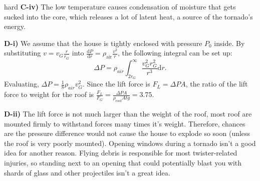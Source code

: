 \begin{solution}{hard}
\noindent \textbf{C-iv)} The low temperature causes condensation of moisture that gets sucked into the core, which releases a lot of latent heat, a source of the tornado's energy.
\vspace{3mm}

\noindent \textbf{D-i)} We assume that the house is tightly enclosed with pressure $P_0$ inside.
By substituting $v = v_G\frac{r}{r_G}$ into $\frac{\mathrm{d}P}{\mathrm{d}r} = \rho_{\text{air}}\frac{v^2}{r}$, the following integral can be set up: 
\[\Delta P = \rho_{air}\int_{2r_G}^{\infty} \frac{v_G^2r_G^2}{r^3} \mathrm{d}r.\]
Evaluating, $\Delta P = \frac{1}{8}\rho_{air}v_G^2$. Since the lift force is $F_L = \Delta PA$, the ratio of the lift force to weight for the roof is $\frac{F_L}{F_G} = \frac{\Delta PA}{\rho_{\text{roof}}Atg} = 3.75$.
\vspace{3mm}

\noindent \textbf{D-ii)} The lift force is not much larger than the weight of the roof, most roof are mounted firmly to withstand forces many times it’s weight. Therefore, chances are the pressure difference would not cause the house to explode so soon (unless the roof is very poorly mounted). Opening windows during a tornado isn't a good idea for another reason. Flying debris is responsible for most twister-related injuries, so standing next to an opening that could potentially blast you with shards of glass and other projectiles isn’t a great idea.

\end{solution}